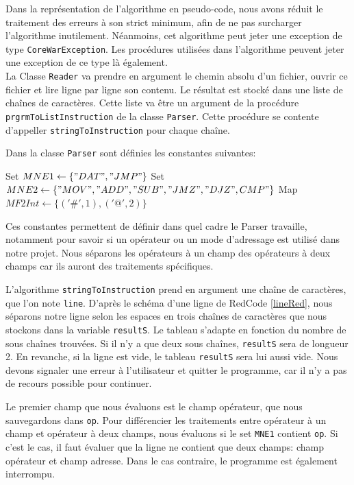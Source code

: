 \documentclass[hidelinks]{report}
\begin{document}
Dans la représentation de l'algorithme en pseudo-code, nous avons réduit le traitement des erreurs à son strict minimum, afin de ne pas surcharger l'algorithme inutilement. Néanmoins, cet algorithme peut jeter une exception de type \texttt{CoreWarException}. Les procédures utilisées dans l'algorithme peuvent jeter une exception de ce type là également.
\\

La Classe \texttt{Reader} va prendre en argument le chemin absolu d'un fichier, ouvrir ce fichier et lire ligne par ligne son contenu. Le résultat est stocké dans une liste de chaînes de caractères. Cette liste va être un argument de la procédure \texttt{prgrmToListInstruction} de la classe \texttt{Parser}. Cette procédure se contente d'appeller \texttt{stringToInstruction} pour chaque chaîne.

Dans la classe \texttt{Parser} sont définies les constantes suivantes:
\\
\LinesNotNumbered
\begin{algorithm}[H]
Set $MNE1 \gets \{"DAT","JMP"\}$\;
Set $MNE2 \gets \{"MOV","ADD","SUB","JMZ","DJZ",CMP"\}$\;
Map $MF2Int \gets \{('\#',1),('@',2)\}$
\end{algorithm}

Ces constantes permettent de définir dans quel cadre le Parser travaille, notamment pour savoir si un opérateur ou un mode d'adressage est utilisé dans notre projet. Nous séparons les opérateurs à un champ des opérateurs à deux champs car ils auront des traitements spécifiques.



L'algorithme \texttt{stringToInstruction} prend en argument une chaîne de caractères, que l'on note \texttt{line}. D'après le schéma d'une ligne de RedCode \autoref{lineRed}, nous séparons notre ligne selon les espaces en trois chaînes de caractères que nous stockons dans la variable \texttt{resultS}. Le tableau s'adapte en fonction du nombre de sous chaînes trouvées. Si il n'y a que deux sous chaînes, \texttt{resultS} sera de longueur 2. En revanche, si la ligne est vide, le tableau \texttt{resultS} sera lui aussi vide. Nous devons signaler une erreur à l'utilisateur et quitter le programme, car il n'y a pas de recours possible pour continuer.

Le premier champ que nous évaluons est le champ opérateur, que nous sauvegardons dans \texttt{op}. Pour différencier les traitements entre opérateur à un champ et opérateur à deux champs, nous évaluons si le set \texttt{MNE1} contient \texttt{op}. Si c'est le cas, il faut évaluer que la ligne ne contient que deux champs: champ opérateur et champ adresse. Dans le cas contraire, le programme est également interrompu.
\end{document}
